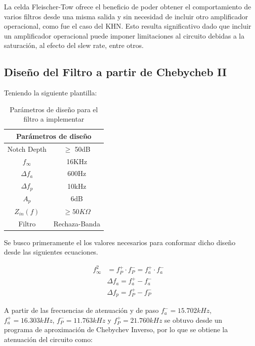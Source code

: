 La celda Fleischer-Tow ofrece el beneficio de poder obtener el comportamiento de varios filtros desde una misma salida y sin necesidad de incluir otro amplificador operacional, como fue el caso del KHN. Esto resulta significativo dado que incluir un amplificador operacional puede imponer limitaciones al circuito debidas a la saturación, al efecto del slew rate, entre otros. 

\subsection{Diseño del Filtro a partir de Chebycheb II}

Teniendo la siguiente plantilla:

\begin{table}[H]
    \centering
    
    \begin{tabular}{cc}
    \hline
    \multicolumn{2}{c}{Par\'ametros de diseño} \\ \hline
    Notch Depth & $\geq$ 50dB \\
    $f_\infty$ & 16KHz \\
    $\Delta f_a$ & 600Hz \\
    $\Delta f_p$ & 10kHz \\
    $A_p$ & 6dB \\
    $Z_{in}(f)$ & $\geq 50K\Omega$ \\
    Filtro & Rechaza-Banda\\\hline
    \end{tabular}%
    \caption{Par\'ametros de diseño para el filtro a implementar}
    \label{ej22diseno}
\end{table}

Se busco primeramente el los valores necesarios para conformar dicho diseño desde las siguientes ecuaciones.

\begin{equation}
    \begin{split}
        f_\infty^2 &= f_P^+ \cdot f_P^- = f_a^+ \cdot f_a^-\\
        &\Delta f_a= f_a^+ - f_a^-\\
        &\Delta f_p = f_P^+ - f_P^-
    \end{split}
    \label{ej4eqf}
\end{equation}

A partir de las frecuencias de atenuación y de paso $f_a^- = 15.702kHz$, $f_a^+ = 16.303kHz$, $f_P^- = 11.763kHz$ y $f_P^+ = 21.760kHz$ se obtuvo desde un programa de aproximación de Chebychev Inverso, por lo que se obtiene la atenuación del circuito como:

